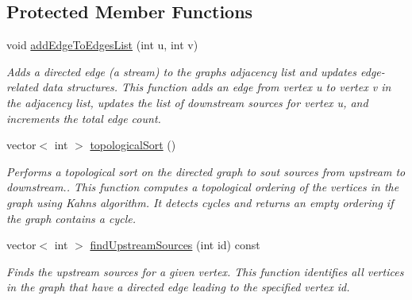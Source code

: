 \subsection*{Protected Member Functions}
\begin{DoxyCompactItemize}
\item 
void \mbox{\hyperlink{classGraph_a6f175234dc3c87150a53eab5c4e586ef}{add\+Edge\+To\+Edges\+List}} (int u, int v)
\begin{DoxyCompactList}\small\item\em Adds a directed edge (a stream) to the graph\textquotesingle{}s adjacency list and updates edge-\/related data structures. This function adds an edge from vertex {\ttfamily u} to vertex {\ttfamily v} in the adjacency list, updates the list of downstream sources for vertex {\ttfamily u}, and increments the total edge count. \end{DoxyCompactList}\item 
vector$<$ int $>$ \mbox{\hyperlink{classGraph_a915f9d58884a00083bb6e5a256141fae}{topological\+Sort}} ()
\begin{DoxyCompactList}\small\item\em Performs a topological sort on the directed graph to sout sources from upstream to downstream.. This function computes a topological ordering of the vertices in the graph using Kahn\textquotesingle{}s algorithm. It detects cycles and returns an empty ordering if the graph contains a cycle. \end{DoxyCompactList}\item 
vector$<$ int $>$ \mbox{\hyperlink{classGraph_a95b0b6a7689c519d38e820cc3f86fc70}{find\+Upstream\+Sources}} (int id) const
\begin{DoxyCompactList}\small\item\em Finds the upstream sources for a given vertex. This function identifies all vertices in the graph that have a directed edge leading to the specified vertex {\ttfamily id}. \end{DoxyCompactList}\end{DoxyCompactItemize}
